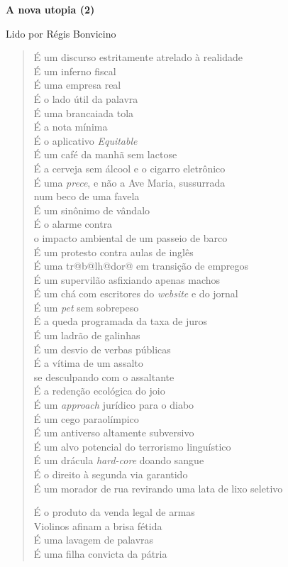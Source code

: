 \pagebreak

\textbf{A nova utopia (2)}

Lido por Régis Bonvicino

\begin{verse}
É um discurso estritamente atrelado à realidade\\
É um inferno fiscal\\
É uma empresa real\\
É o lado útil da palavra\\[5pt]
É uma brancaiada tola\\
É a nota mínima\\
É o aplicativo \emph{Equitable}\\
É um café da manhã sem lactose\\[5pt]
É a cerveja sem álcool e o cigarro eletrônico\\
É uma \emph{prece}, e não a Ave Maria, sussurrada\\
num beco de uma favela\\
É um sinônimo de vândalo\\[5pt]
É o alarme contra\\
o impacto ambiental de um passeio de barco\\
É um protesto contra aulas de inglês\\
É uma tr@b@lh@dor@ em transição de empregos\\[5pt]
É um supervilão asfixiando apenas machos\\
É um chá com escritores do \emph{website} e do jornal\\
É um \emph{pet} sem sobrepeso\\
É a queda programada da taxa de juros\\[5pt]
É um ladrão de galinhas\\
É um desvio de verbas públicas\\
É a vítima de um assalto\\
se desculpando com o assaltante\\[5pt]
É a redenção ecológica do joio\\
É um \emph{approach} jurídico para o diabo\\
É um cego paraolímpico\\
É um antiverso altamente subversivo\\[5pt]
É um alvo potencial do terrorismo linguístico\\
É um drácula \emph{hard-core} doando sangue\\
É o direito à segunda via garantido\\
É um morador de rua revirando uma lata de lixo seletivo\\[5pt]

\pagebreak

É o produto da venda legal de armas\\
Violinos afinam a brisa fétida\\
É uma lavagem de palavras\\
É uma filha convicta da pátria
\end{verse}

